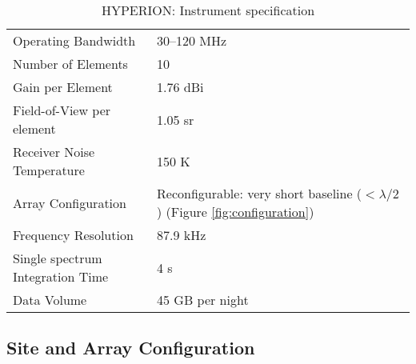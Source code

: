 \documentclass[12pt]{amsart}
\begin{document}
\begin{table}[htb]
\caption{ HYPERION: Instrument specification}
\begin{tabular}{l|l}
\hline\hline
Operating Bandwidth & 30--120 MHz \\
Number of Elements & 10 \\
Gain per Element & 1.76 dBi \\
Field-of-View per element & 1.05 sr \\
Receiver Noise Temperature & 150 K \\
Array Configuration & Reconfigurable: very short baseline ($<\lambda/2$) (Figure \ref{fig:configuration})\\
Frequency Resolution & 87.9 kHz\\
Single spectrum Integration Time & 4 s\\
Data Volume & 45 GB per night \\
\hline
\end{tabular}
\label{tab:features}
\end{table}




\subsection{Site and Array Configuration}


\end{document}
